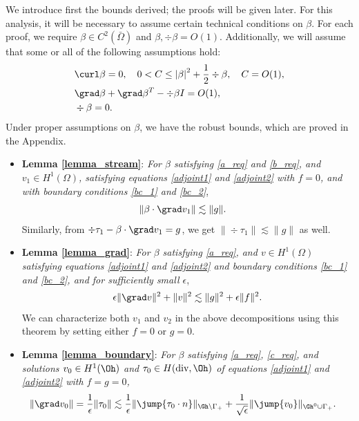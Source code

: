 We introduce first the bounds derived; the proofs will be given later. For this analysis, it will be necessary to assume certain technical conditions on $\beta$.  For each proof, we require $\beta \in C^2(\bar{\Omega})$ and $\beta, \div \beta = O(1)$.  Additionally, we will assume that some or all of the following assumptions hold:
\begin{align}
&\curl \beta = 0, \quad 0<C \leq \left | \beta\right |^2 + \frac{1}{2}\div \beta, \quad C = O(1) \label{a_req},\\
&\grad \beta + \grad \beta ^T - \div \beta I = O(1) \label{b_req},\\
&\div \beta = 0 \label{c_req}.
\end{align}
Under proper assumptions on $\beta$, we have the robust bounds, which are proved in the Appendix. 
\begin{itemize}
\item \textbf{Lemma \ref{lemma_stream}}: \textit{For $\beta$ satisfying \eqref{a_req} and \eqref{b_req}, %
and $v_1 \in H^1(\Omega)$, satisfying equations \eqref{adjoint1} and \eqref{adjoint2} with $f=0$, and with boundary conditions \eqref{bc_1} and \eqref{bc_2}},
\begin{align*}
\|\beta \cdot \grad v_1 \| &\lesssim \| g\|.
\end{align*}
Similarly, from $\div \tau_1 - \beta\cdot \grad v_1 = g$, we get $\|\div \tau_1\| \lesssim \|g\|$ as well.  
\item \textbf{Lemma \ref{lemma_grad}}: \textit{For $\beta$ satisfying \eqref{a_req}, and $v \in H^1(\Omega)$ satisfying equations \eqref{adjoint1} and \eqref{adjoint2} and boundary conditions \eqref{bc_1} and \eqref{bc_2}, and for sufficiently small $\epsilon$},
\[
\epsilon \|\grad v\|^2 + \|v\|^2 \lesssim \|g\|^2 + \epsilon \|f\|^2.
\]
We can characterize both $v_1$ and $v_2$ in the above decompositions using this theorem by setting either $f=0$ or $g=0$. 
\item \textbf{Lemma \ref{lemma_boundary}}: \textit{For $\beta$ satisfying \eqref{a_req}, \eqref{c_req}, and solutions $v_0 \in H^1(\Oh)$ and $\tau_0 \in H({\rm div},\Oh)$ of equations \eqref{adjoint1} and \eqref{adjoint2} with $f=g=0$,} 
\begin{align*}
\|\grad v_0\| = \frac{1}{\epsilon}\|\tau_0\| &\lesssim \frac{1}{\epsilon} \| \jump{\tau_0\cdot n}\|_{\Gh \setminus \Gamma_+} + \frac{1}{\sqrt{\epsilon}} \| \jump{v_0}\|_{\Gh^0 \cup \Gamma_+}.
\end{align*}
\end{itemize}
